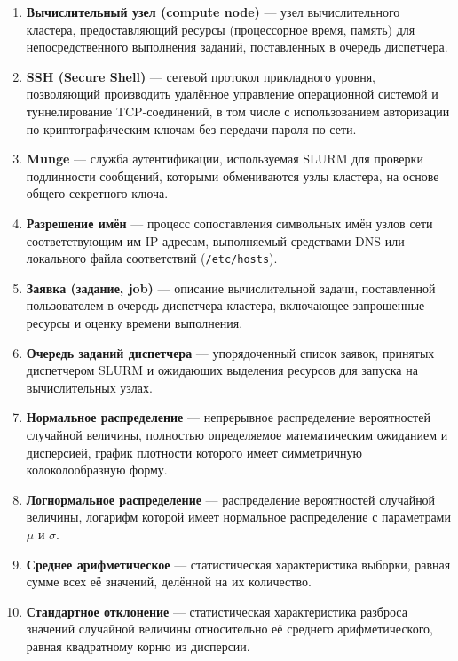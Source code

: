 \begin{enumerate}
\item \textbf{Вычислительный узел (compute node)} --- узел вычислительного
кластера, предоставляющий ресурсы (процессорное время, память) для
непосредственного выполнения заданий, поставленных в очередь диспетчера.

\item \textbf{SSH (Secure Shell)} --- сетевой протокол прикладного уровня,
позволяющий производить удалённое управление операционной системой и
туннелирование TCP-соединений, в том числе с использованием авторизации по
криптографическим ключам без передачи пароля по сети.

\item \textbf{Munge} --- служба аутентификации, используемая SLURM для
проверки подлинности сообщений, которыми обмениваются узлы кластера, на
основе общего секретного ключа.

\item \textbf{Разрешение имён} --- процесс сопоставления символьных имён
узлов сети соответствующим им IP-адресам, выполняемый средствами DNS или
локального файла соответствий (\texttt{/etc/hosts}).

\item \textbf{Заявка (задание, job)} --- описание вычислительной задачи,
поставленной пользователем в очередь диспетчера кластера, включающее
запрошенные ресурсы и оценку времени выполнения.

\item \textbf{Очередь заданий диспетчера} --- упорядоченный список заявок,
принятых диспетчером SLURM и ожидающих выделения ресурсов для запуска на
вычислительных узлах.

\item \textbf{Нормальное распределение} --- непрерывное распределение
вероятностей случайной величины, полностью определяемое математическим
ожиданием и дисперсией, график плотности которого имеет симметричную
колоколообразную форму.

\item \textbf{Логнормальное распределение} --- распределение вероятностей
случайной величины, логарифм которой имеет нормальное распределение с
параметрами $\mu$ и $\sigma$.

\item \textbf{Среднее арифметическое} --- статистическая характеристика
выборки, равная сумме всех её значений, делённой на их количество.

\item \textbf{Стандартное отклонение} --- статистическая характеристика
разброса значений случайной величины относительно её среднего
арифметического, равная квадратному корню из дисперсии.

\end{enumerate}